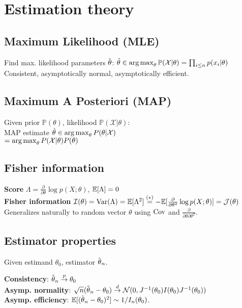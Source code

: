 \section*{Estimation theory}

\subsection*{Maximum Likelihood (MLE)}
Find  max. likelihood parameters $\hat{\kern0pt \theta}$:
$\hat{\theta}\in \operatorname*{arg\,max}_\theta \mathbb{P}(\mathcal{X}|\theta) =\prod_{i\leq n}p(x_i|\theta)$\\
Consistent, asymptotically normal, asymptotically efficient.

\subsection*{Maximum A Posteriori (MAP)}
Given prior $\mathbb{P}(\theta)$, likelihood $\mathbb{P}(\mathcal{X}|\theta)$:\\  MAP estimate $\hat{\theta}\in \operatorname*{arg\,max}_\theta P(\theta|\mathcal{X})$\\ $=\operatorname*{arg\,max}_\theta P(\mathcal{X}|\theta)P(\theta)$\\

\subsection*{Fisher information}
\textbf{Score} $\Lambda = \frac{\partial}{\partial\theta} \log p(X;\theta)$, $\mathbb{E}[\Lambda] = 0$\\
\textbf{Fisher information} $\mathcal{I}(\theta) = \mathrm{Var}(\Lambda) = \mathbb{E}[\Lambda^2] \overset{(*)}{=}
-\mathbb{E}[\frac{\partial}{\partial\theta^2} \log p(X;\theta)] = \mathcal{J}(\theta)$
Generalizes naturally to random vector $\mathbb{\theta}$ using $\mathrm{Cov}$ and $\frac{\partial}{\partial\theta\partial\theta^T}$.

\subsection*{Estimator properties}

Given estimand $\theta_0$, estimator $\hat{\kern0pt \theta}_n$.

\textbf{Consistency}: $\hat{\kern0pt \theta}_n \overset{p}{\to} \theta_0$\\
\textbf{Asymp. normality}: $\sqrt{n}(\hat{\kern0pt \theta}_n-\theta_0) \overset{d}{\to} \mathcal{N}(0, J^{-1}(\theta_0)I(\theta_0)J^{-1}(\theta_0))$\\
\textbf{Asymp. efficiency}:
$\mathbb{E}[(\hat{\kern0pt \theta}_n - \theta_0)^2]\sim 1/I_n(\theta_0)$.


